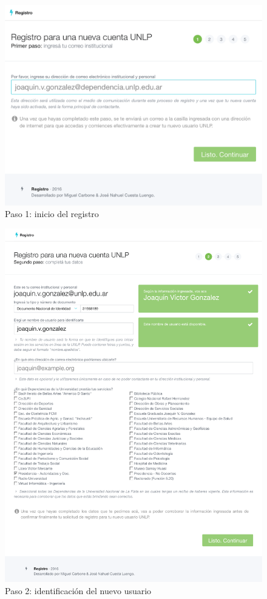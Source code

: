 \begin{figure}[H]
  \centering
  \includegraphics[width=\textwidth]{src/images/05-capitulo-5/capturas/page_001.png}
  \caption{Paso 1: inicio del registro}
  \label{fig:caso-testigo:captura-001}
\end{figure}

\begin{figure}[H]
  \centering
  \includegraphics[width=\textwidth,keepaspectratio]{src/images/05-capitulo-5/capturas/page_002.png}
  \caption{Paso 2: identificación del nuevo usuario}
  \label{fig:caso-testigo:captura-002}
\end{figure}

